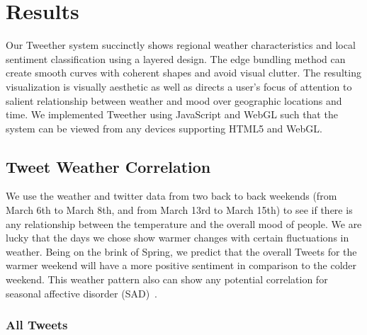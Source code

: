 \section{Results}

Our Tweether system succinctly shows regional weather characteristics and local sentiment classification using a layered design. The edge bundling method can create smooth curves with coherent shapes and avoid visual clutter. The resulting visualization is visually aesthetic as well as directs a user's focus of attention to salient relationship between weather and mood over geographic locations and time. We implemented Tweether using JavaScript and WebGL such that the system can be viewed from any devices supporting HTML5 and WebGL. 


%


\subsection{Tweet Weather Correlation}

We use the weather and twitter data from two back to back weekends (from March 6th to March 8th, and from March 13rd to March 15th) to see if there is any relationship between the temperature and the overall mood of people. We are lucky that the days we chose show warmer changes with certain fluctuations in weather. Being on the brink of Spring, we predict that the overall Tweets for the warmer weekend will have a more positive sentiment in comparison to the colder weekend. This weather pattern also can show any potential correlation for seasonal affective disorder (SAD)~\cite{denissen2008effects}.

\subsubsection{All Tweets}

